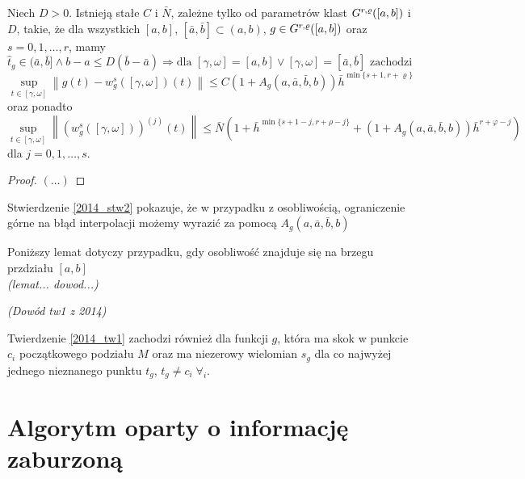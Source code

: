 \documentclass[oik, pdftex, robocza, man]{mgrwms}
\begin{document}
\begin{stw}
    \label{2014_stw2}
    Niech $D > 0$. Istnieją stałe $C$ i $\bar{N}$, zależne tylko od parametrów klast $G^{r,\varrho}([a,b])$ i $D$, takie, że dla wszystkich $[a,b]$, $[\bar{a}, \bar{b}] \subset (a,b)$, $g \in G^{r,\varrho}([a,b])$ oraz $s=0,1,\dots,r$, mamy
    \begin{equation*}
        \hat{t}_{g} \in (\bar{a}, \bar{b}] \land b-a \leq D(\bar{b}-\bar{a}) \Longrightarrow \text{dla } [\gamma, \omega]=[a, b] \vee [\gamma, \omega]=[\bar{a}, \bar{b}] \text{ zachodzi }
    \end{equation*}
    \begin{equation*}
        \sup _{t \in[\gamma, \omega]}\left\|g(t)-w_{g}^{s}([\gamma, \omega])(t)\right\| \leq C\left(1+A_{g}(a, \bar{a}, \bar{b}, b)\right) \bar{h}^{\min \{s+1, r+\varrho\}}
    \end{equation*}
    oraz ponadto
    \begin{equation*}
        \sup _{t \in[\gamma, \omega]}\left\|\left(w_{g}^{s}([\gamma, \omega])\right)^{(j)}(t)\right\| \leq \bar{N}\left(1+\bar{h}^{\min \{s+1-j, r+\rho-j\}}+\left(1+A_{g}(a, \bar{a}, \bar{b}, b)\right) \bar{h}^{r+\varphi-j}\right)
    \end{equation*}
    dla $j=0,1,\dots,s$.
\end{stw}
\begin{proof}
    $(\dots)$
\end{proof}

\begin{uw}
    Stwierdzenie \ref{2014_stw2} pokazuje, że w przypadku z osobliwością, ograniczenie górne na błąd interpolacji możemy wyrazić za pomocą $A_{g}(a, \bar{a}, \bar{b}, b)$
\end{uw}

Poniższy lemat dotyczy przypadku, gdy osobliwość znajduje się na brzegu przdziału $[a,b]$\\
\textit{(lemat... dowod...)}

\textit{(Dowód tw1 z 2014)}

\begin{uw}
    Twierdzenie \ref{2014_tw1} zachodzi również dla funkcji $g$, która ma skok w punkcie $c_{i}$ początkowego podziału $M$ oraz ma niezerowy wielomian $s_{g}$ dla co najwyżej jednego nieznanego punktu $t_{g}$, $t_{g} \neq c_{i} \; \forall_{i}$.
\end{uw}


\section{Algorytm oparty o informację zaburzoną}
\end{document}
